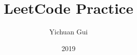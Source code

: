 \documentclass[12pt]{report}
\begin{document}
\title{\bf LeetCode Practice}
\author{Yichuan Gui}
\date{2019}
\maketitle

\tableofcontents
\cleardoublepage

\newpage
\setcounter{page}{1}
\cleardoublepage














\end{document}
